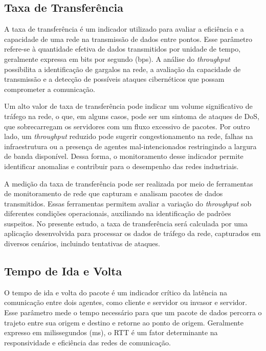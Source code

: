     \subsection{Taxa de Transferência}
    
        A taxa de transferência é um indicador utilizado para avaliar a eficiência e a capacidade de uma rede na transmissão de dados entre pontos. Esse parâmetro refere-se à quantidade efetiva de dados transmitidos por unidade de tempo, geralmente expressa em bits por segundo (bps). A análise do \textit{throughput} possibilita a identificação de gargalos na rede, a avaliação da capacidade de transmissão e a detecção de possíveis ataques cibernéticos que possam comprometer a comunicação.

        Um alto valor de taxa de transferência pode indicar um volume significativo de tráfego na rede, o que, em alguns casos, pode ser um sintoma de ataques de DoS, que sobrecarregam os servidores com um fluxo excessivo de pacotes. Por outro lado, um \textit{throughput} reduzido pode sugerir congestionamento na rede, falhas na infraestrutura ou a presença de agentes mal-intencionados restringindo a largura de banda disponível. Dessa forma, o monitoramento desse indicador permite identificar anomalias e contribuir para o desempenho das redes industriais.
        
        A medição da taxa de transferência pode ser realizada por meio de ferramentas de monitoramento de rede que capturam e analisam pacotes de dados transmitidos. Essas ferramentas permitem avaliar a variação do \textit{throughput} sob diferentes condições operacionais, auxiliando na identificação de padrões suspeitos. No presente estudo, a taxa de transferência será calculada por uma aplicação desenvolvida para processar os dados de tráfego da rede, capturados em diversos cenários, incluindo tentativas de ataques.

    \subsection{Tempo de Ida e Volta}

        O tempo de ida e volta do pacote é um indicador crítico da latência na comunicação entre dois agentes, como cliente e servidor ou invasor e servidor. Esse parâmetro mede o tempo necessário para que um pacote de dados percorra o trajeto entre sua origem e destino e retorne ao ponto de origem. Geralmente expresso em milissegundos (ms), o RTT é um fator determinante na responsividade e eficiência das redes de comunicação.

